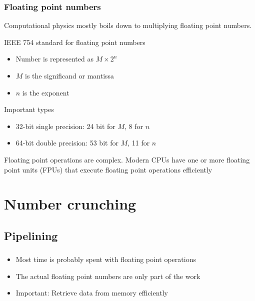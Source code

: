 \documentclass[usenames,dvipsnames,mathserif,compress]{beamer}
\begin{document}
\begin{frame}
  \frametitle{Floating point numbers}
  Computational physics mostly boils down to multiplying floating point numbers.
  \begin{block}{IEEE 754 standard for floating point numbers}
    \begin{itemize}
    \item Number is represented as $M \times 2^n$
    \item $M$ is the significand or mantissa
    \item $n$ is the exponent
    \end{itemize}
  \end{block}
  \begin{block}{Important types}
    \begin{itemize}
    \item 32-bit single precision: 24 bit for $M$, 8 for $n$
    \item 64-bit double precision: 53 bit for $M$, 11 for $n$
    \end{itemize}
  \end{block}
  Floating point operations are complex.
  Modern CPUs have one or more \alert{floating point units} (FPUs)
  that execute floating point operations efficiently
\end{frame}

\section*{Number crunching}
\subsection*{Pipelining}

\begin{frame}
  \frametitle{}
  \begin{itemize}
  \item Most time is probably spent with floating point operations
  \item The actual floating point numbers are only part of the work
  \item Important: Retrieve data from memory efficiently
  \end{itemize}
\end{frame}
\end{document}

